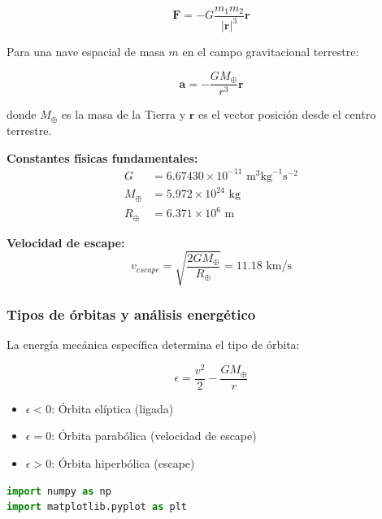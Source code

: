 \documentclass{article}
\begin{document}
\begin{center}
	\begin{equation}
		\mathbf{F} = -G\frac{m_1 m_2}{|\mathbf{r}|^3}\mathbf{r}
	\end{equation}
	
	Para una nave espacial de masa $m$ en el campo gravitacional terrestre:
	
	\begin{equation}
		\mathbf{a} = -\frac{GM_{\oplus}}{r^3}\mathbf{r}
	\end{equation}
	
	donde $M_{\oplus}$ es la masa de la Tierra y $\mathbf{r}$ es el vector posición desde el centro terrestre.
	
	\textbf{Constantes físicas fundamentales:}
	\begin{align}
		G &= 6.67430 \times 10^{-11} \text{ m}^3\text{kg}^{-1}\text{s}^{-2} \\
		M_{\oplus} &= 5.972 \times 10^{24} \text{ kg} \\
		R_{\oplus} &= 6.371 \times 10^6 \text{ m}
	\end{align}
	
	\textbf{Velocidad de escape:}
	\begin{equation}
		v_{escape} = \sqrt{\frac{2GM_{\oplus}}{R_{\oplus}}} = 11.18 \text{ km/s}
	\end{equation}
	
	\subsubsection{Tipos de órbitas y análisis energético}
	
	La energía mecánica específica determina el tipo de órbita:
	
	\begin{equation}
		\epsilon = \frac{v^2}{2} - \frac{GM_{\oplus}}{r}
	\end{equation}
	
	\begin{itemize}
		\item $\epsilon < 0$: Órbita elíptica (ligada)
		\item $\epsilon = 0$: Órbita parabólica (velocidad de escape)
		\item $\epsilon > 0$: Órbita hiperbólica (escape)
	\end{itemize}
	
	\begin{lstlisting}[language=Python, caption={Análisis completo del sistema Tierra-nave}]
import numpy as np
import matplotlib.pyplot as plt


\end{lstlisting}
\end{center}
\end{document}

